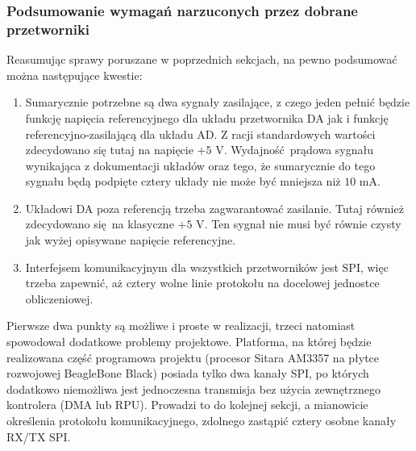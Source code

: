\documentclass{scrartcl}
\begin{document}
\subsubsection{Podsumowanie wymagań narzuconych przez dobrane przetworniki}
Reasumując sprawy poruszane w poprzednich sekcjach, na pewno podsumować można następujące kwestie:
\begin{enumerate}
    \item Sumarycznie potrzebne są dwa sygnały zasilające, z czego jeden pełnić będzie funkcję napięcia referencyjnego dla układu przetwornika DA jak i funkcję referencyjno-zasilającą dla układu AD. Z racji standardowych wartości zdecydowano się tutaj na napięcie $+5$ V. Wydajność prądowa sygnału wynikająca z dokumentacji układów oraz tego, że sumarycznie do tego sygnału będą podpięte cztery układy nie może być mniejsza niż $10$ mA.
    \item Układowi DA poza referencją trzeba zagwarantować zasilanie. Tutaj również zdecydowano się na klasyczne $+5$ V. Ten sygnał nie musi być równie czysty jak wyżej opisywane napięcie referencyjne.
    \item Interfejsem komunikacyjnym dla wszystkich przetworników jest SPI, więc trzeba zapewnić, aż cztery wolne linie protokołu na docelowej jednostce obliczeniowej.
\end{enumerate}
Pierwsze dwa punkty są możliwe i proste w realizacji, trzeci natomiast spowodował dodatkowe problemy projektowe. Platforma, na której będzie realizowana część programowa projektu (procesor Sitara AM3357 na płytce rozwojowej BeagleBone Black) posiada tylko dwa kanały SPI, po których dodatkowo niemożliwa jest jednoczesna transmisja bez użycia zewnętrznego kontrolera (DMA lub RPU). Prowadzi to do kolejnej sekcji, a mianowicie określenia protokołu komunikacyjnego, zdolnego zastąpić cztery osobne kanały RX/TX SPI.
\end{document}
